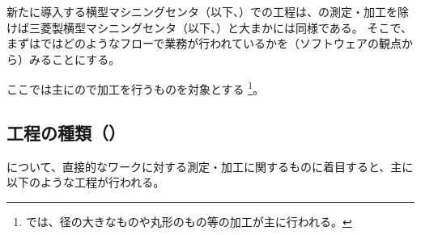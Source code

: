 

新たに導入する横型マシニングセンタ（以下、\textbf{\DMC}）での工程は、\Dimple の測定・加工を除けば三菱製横型マシニングセンタ（以下、\textbf{\MMC}）と大まかには同様である。
そこで、まずは\MMC ではどのようなフローで業務が行われているかを（ソフトウェアの観点から）みることにする。
\begin{marker}
ここでは主に\MMC の\nameNoOnePalette で加工を行うものを対象とする
\footnote{\nameNoTwoPalette では、径の大きなものや丸形のもの等の加工が主に行われる。}。
\end{marker}





\subsection{工程の種類（\yomiMMC）}
\MMC について、直接的なワークに対する測定・加工に関するものに着目すると、主に以下のような工程が行われる。\\

